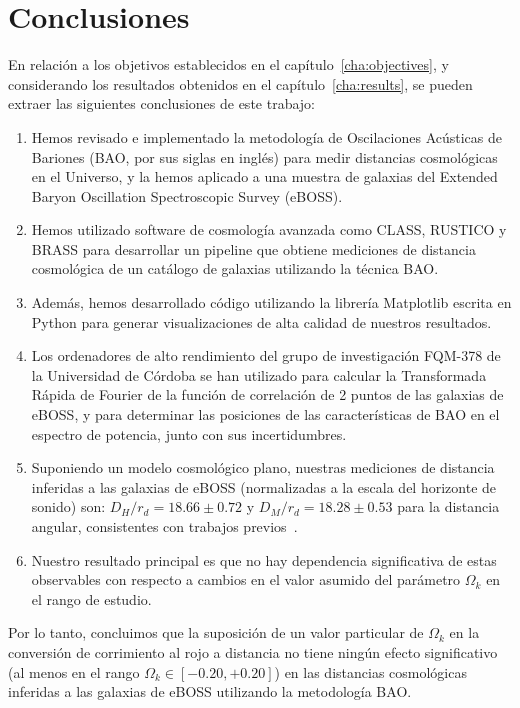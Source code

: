 \chapter*{Conclusiones}

En relación a los objetivos establecidos en el capítulo~\ref{cha:objectives}, y considerando los resultados obtenidos en el capítulo~\ref{cha:results}, se pueden extraer las siguientes conclusiones de este trabajo:

\begin{enumerate}
\item Hemos revisado e implementado la metodología de Oscilaciones Acústicas de Bariones (BAO, por sus siglas en inglés) para medir distancias cosmológicas en el Universo, y la hemos aplicado a una muestra de galaxias del Extended Baryon Oscillation Spectroscopic Survey (eBOSS).
\item Hemos utilizado software de cosmología avanzada como CLASS, RUSTICO y BRASS para desarrollar un pipeline que obtiene mediciones de distancia cosmológica de un catálogo de galaxias utilizando la técnica BAO.
\item Además, hemos desarrollado código utilizando la librería Matplotlib escrita en Python para generar visualizaciones de alta calidad de nuestros resultados.
\item Los ordenadores de alto rendimiento del grupo de investigación FQM-378 de la Universidad de Córdoba se han utilizado para calcular la Transformada Rápida de Fourier de la función de correlación de 2 puntos de las galaxias de eBOSS, y para determinar las posiciones de las características de BAO en el espectro de potencia, junto con sus incertidumbres.
\item Suponiendo un modelo cosmológico plano, nuestras mediciones de distancia inferidas a las galaxias de eBOSS (normalizadas a la escala del horizonte de sonido) son: $D_H/r_d = 18.66 \pm 0.72$ y $D_M/r_d = 18.28 \pm 0.53$ para la distancia angular, consistentes con trabajos previos~\cite{hector}.
\item Nuestro resultado principal es que no hay dependencia significativa de estas observables con respecto a cambios en el valor asumido del parámetro $ \Omega_k$ en el rango de estudio.
\end{enumerate}

Por lo tanto, concluimos que la suposición de un valor particular de $\Omega_k$ en la conversión de corrimiento al rojo a distancia no tiene ningún efecto significativo (al menos en el rango $\Omega_k \in [-0.20, +0.20]$) en las distancias cosmológicas inferidas a las galaxias de eBOSS utilizando la metodología BAO.

